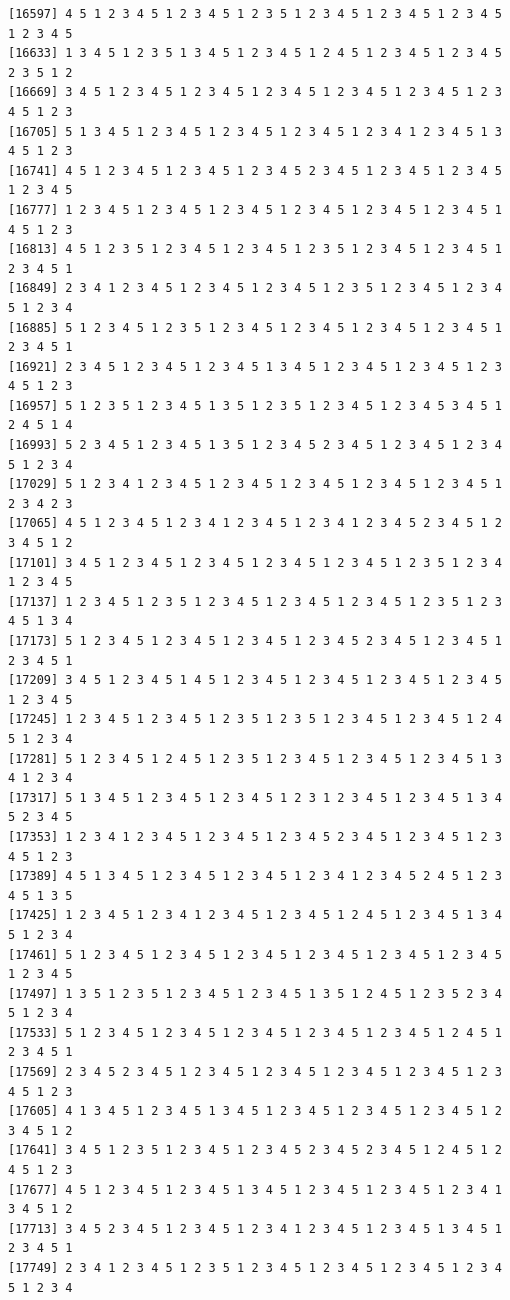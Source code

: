 \documentclass[
  11pt,
]{book}
\begin{document}
\begin{verbatim}
[16597] 4 5 1 2 3 4 5 1 2 3 4 5 1 2 3 5 1 2 3 4 5 1 2 3 4 5 1 2 3 4 5 1 2 3 4 5
[16633] 1 3 4 5 1 2 3 5 1 3 4 5 1 2 3 4 5 1 2 4 5 1 2 3 4 5 1 2 3 4 5 2 3 5 1 2
[16669] 3 4 5 1 2 3 4 5 1 2 3 4 5 1 2 3 4 5 1 2 3 4 5 1 2 3 4 5 1 2 3 4 5 1 2 3
[16705] 5 1 3 4 5 1 2 3 4 5 1 2 3 4 5 1 2 3 4 5 1 2 3 4 1 2 3 4 5 1 3 4 5 1 2 3
[16741] 4 5 1 2 3 4 5 1 2 3 4 5 1 2 3 4 5 2 3 4 5 1 2 3 4 5 1 2 3 4 5 1 2 3 4 5
[16777] 1 2 3 4 5 1 2 3 4 5 1 2 3 4 5 1 2 3 4 5 1 2 3 4 5 1 2 3 4 5 1 4 5 1 2 3
[16813] 4 5 1 2 3 5 1 2 3 4 5 1 2 3 4 5 1 2 3 5 1 2 3 4 5 1 2 3 4 5 1 2 3 4 5 1
[16849] 2 3 4 1 2 3 4 5 1 2 3 4 5 1 2 3 4 5 1 2 3 5 1 2 3 4 5 1 2 3 4 5 1 2 3 4
[16885] 5 1 2 3 4 5 1 2 3 5 1 2 3 4 5 1 2 3 4 5 1 2 3 4 5 1 2 3 4 5 1 2 3 4 5 1
[16921] 2 3 4 5 1 2 3 4 5 1 2 3 4 5 1 3 4 5 1 2 3 4 5 1 2 3 4 5 1 2 3 4 5 1 2 3
[16957] 5 1 2 3 5 1 2 3 4 5 1 3 5 1 2 3 5 1 2 3 4 5 1 2 3 4 5 3 4 5 1 2 4 5 1 4
[16993] 5 2 3 4 5 1 2 3 4 5 1 3 5 1 2 3 4 5 2 3 4 5 1 2 3 4 5 1 2 3 4 5 1 2 3 4
[17029] 5 1 2 3 4 1 2 3 4 5 1 2 3 4 5 1 2 3 4 5 1 2 3 4 5 1 2 3 4 5 1 2 3 4 2 3
[17065] 4 5 1 2 3 4 5 1 2 3 4 1 2 3 4 5 1 2 3 4 1 2 3 4 5 2 3 4 5 1 2 3 4 5 1 2
[17101] 3 4 5 1 2 3 4 5 1 2 3 4 5 1 2 3 4 5 1 2 3 4 5 1 2 3 5 1 2 3 4 1 2 3 4 5
[17137] 1 2 3 4 5 1 2 3 5 1 2 3 4 5 1 2 3 4 5 1 2 3 4 5 1 2 3 5 1 2 3 4 5 1 3 4
[17173] 5 1 2 3 4 5 1 2 3 4 5 1 2 3 4 5 1 2 3 4 5 2 3 4 5 1 2 3 4 5 1 2 3 4 5 1
[17209] 3 4 5 1 2 3 4 5 1 4 5 1 2 3 4 5 1 2 3 4 5 1 2 3 4 5 1 2 3 4 5 1 2 3 4 5
[17245] 1 2 3 4 5 1 2 3 4 5 1 2 3 5 1 2 3 5 1 2 3 4 5 1 2 3 4 5 1 2 4 5 1 2 3 4
[17281] 5 1 2 3 4 5 1 2 4 5 1 2 3 5 1 2 3 4 5 1 2 3 4 5 1 2 3 4 5 1 3 4 1 2 3 4
[17317] 5 1 3 4 5 1 2 3 4 5 1 2 3 4 5 1 2 3 1 2 3 4 5 1 2 3 4 5 1 3 4 5 2 3 4 5
[17353] 1 2 3 4 1 2 3 4 5 1 2 3 4 5 1 2 3 4 5 2 3 4 5 1 2 3 4 5 1 2 3 4 5 1 2 3
[17389] 4 5 1 3 4 5 1 2 3 4 5 1 2 3 4 5 1 2 3 4 1 2 3 4 5 2 4 5 1 2 3 4 5 1 3 5
[17425] 1 2 3 4 5 1 2 3 4 1 2 3 4 5 1 2 3 4 5 1 2 4 5 1 2 3 4 5 1 3 4 5 1 2 3 4
[17461] 5 1 2 3 4 5 1 2 3 4 5 1 2 3 4 5 1 2 3 4 5 1 2 3 4 5 1 2 3 4 5 1 2 3 4 5
[17497] 1 3 5 1 2 3 5 1 2 3 4 5 1 2 3 4 5 1 3 5 1 2 4 5 1 2 3 5 2 3 4 5 1 2 3 4
[17533] 5 1 2 3 4 5 1 2 3 4 5 1 2 3 4 5 1 2 3 4 5 1 2 3 4 5 1 2 4 5 1 2 3 4 5 1
[17569] 2 3 4 5 2 3 4 5 1 2 3 4 5 1 2 3 4 5 1 2 3 4 5 1 2 3 4 5 1 2 3 4 5 1 2 3
[17605] 4 1 3 4 5 1 2 3 4 5 1 3 4 5 1 2 3 4 5 1 2 3 4 5 1 2 3 4 5 1 2 3 4 5 1 2
[17641] 3 4 5 1 2 3 5 1 2 3 4 5 1 2 3 4 5 2 3 4 5 2 3 4 5 1 2 4 5 1 2 4 5 1 2 3
[17677] 4 5 1 2 3 4 5 1 2 3 4 5 1 3 4 5 1 2 3 4 5 1 2 3 4 5 1 2 3 4 1 3 4 5 1 2
[17713] 3 4 5 2 3 4 5 1 2 3 4 5 1 2 3 4 1 2 3 4 5 1 2 3 4 5 1 3 4 5 1 2 3 4 5 1
[17749] 2 3 4 1 2 3 4 5 1 2 3 5 1 2 3 4 5 1 2 3 4 5 1 2 3 4 5 1 2 3 4 5 1 2 3 4

\end{verbatim}
\end{document}
